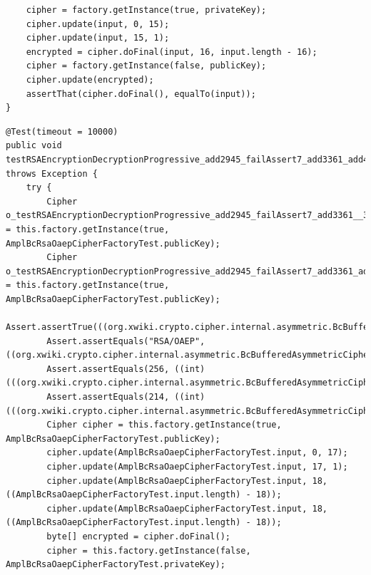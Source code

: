 \documentclass[a4paper,11pt]{sdm_internship}
\theoremstyle{definition}
\begin{document}
\begin{appendices}
\begin{listing}[H]
\begin{verbatim}
    cipher = factory.getInstance(true, privateKey);
    cipher.update(input, 0, 15);
    cipher.update(input, 15, 1);
    encrypted = cipher.doFinal(input, 16, input.length - 16);
    cipher = factory.getInstance(false, publicKey);
    cipher.update(encrypted);
    assertThat(cipher.doFinal(), equalTo(input));
}
  \end{verbatim}
  \caption{Test from the XWiki project.}%
\label{lst:xwiki_test}
\end{listing}
\begin{listing}[H]
  \centering
  \begin{verbatim}
@Test(timeout = 10000)
public void testRSAEncryptionDecryptionProgressive_add2945_failAssert7_add3361_add4592() throws Exception {
    try {
        Cipher o_testRSAEncryptionDecryptionProgressive_add2945_failAssert7_add3361__3 = this.factory.getInstance(true, AmplBcRsaOaepCipherFactoryTest.publicKey);
        Cipher o_testRSAEncryptionDecryptionProgressive_add2945_failAssert7_add3361_add4592__6 = this.factory.getInstance(true, AmplBcRsaOaepCipherFactoryTest.publicKey);
        Assert.assertTrue(((org.xwiki.crypto.cipher.internal.asymmetric.BcBufferedAsymmetricCipher)o_testRSAEncryptionDecryptionProgressive_add2945_failAssert7_add3361_add4592__6).isForEncryption());
        Assert.assertEquals("RSA/OAEP", ((org.xwiki.crypto.cipher.internal.asymmetric.BcBufferedAsymmetricCipher)o_testRSAEncryptionDecryptionProgressive_add2945_failAssert7_add3361_add4592__6).getAlgorithmName());
        Assert.assertEquals(256, ((int) (((org.xwiki.crypto.cipher.internal.asymmetric.BcBufferedAsymmetricCipher)o_testRSAEncryptionDecryptionProgressive_add2945_failAssert7_add3361_add4592__6).getOutputBlockSize())));
        Assert.assertEquals(214, ((int) (((org.xwiki.crypto.cipher.internal.asymmetric.BcBufferedAsymmetricCipher)o_testRSAEncryptionDecryptionProgressive_add2945_failAssert7_add3361_add4592__6).getInputBlockSize())));
        Cipher cipher = this.factory.getInstance(true, AmplBcRsaOaepCipherFactoryTest.publicKey);
        cipher.update(AmplBcRsaOaepCipherFactoryTest.input, 0, 17);
        cipher.update(AmplBcRsaOaepCipherFactoryTest.input, 17, 1);
        cipher.update(AmplBcRsaOaepCipherFactoryTest.input, 18, ((AmplBcRsaOaepCipherFactoryTest.input.length) - 18));
        cipher.update(AmplBcRsaOaepCipherFactoryTest.input, 18, ((AmplBcRsaOaepCipherFactoryTest.input.length) - 18));
        byte[] encrypted = cipher.doFinal();
        cipher = this.factory.getInstance(false, AmplBcRsaOaepCipherFactoryTest.privateKey);

\end{verbatim}
\end{listing}
\end{appendices}
\end{document}
